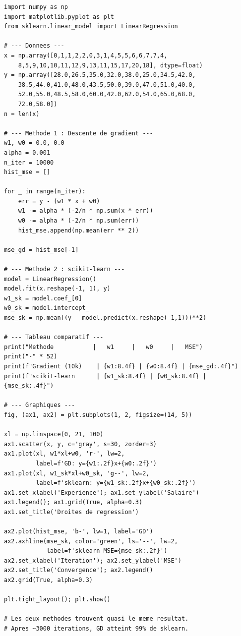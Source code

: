 \begin{pythonbox}
\begin{lstlisting}
import numpy as np
import matplotlib.pyplot as plt
from sklearn.linear_model import LinearRegression

# --- Donnees ---
x = np.array([0,1,1,2,2,0,3,1,4,5,5,6,6,7,7,4,
    8,5,9,10,10,11,12,9,13,11,15,17,20,18], dtype=float)
y = np.array([28.0,26.5,35.0,32.0,38.0,25.0,34.5,42.0,
    38.5,44.0,41.0,48.0,43.5,50.0,39.0,47.0,51.0,40.0,
    52.0,55.0,48.5,58.0,60.0,42.0,62.0,54.0,65.0,68.0,
    72.0,58.0])
n = len(x)

# --- Methode 1 : Descente de gradient ---
w1, w0 = 0.0, 0.0
alpha = 0.001
n_iter = 10000
hist_mse = []

for _ in range(n_iter):
    err = y - (w1 * x + w0)
    w1 -= alpha * (-2/n * np.sum(x * err))
    w0 -= alpha * (-2/n * np.sum(err))
    hist_mse.append(np.mean(err ** 2))

mse_gd = hist_mse[-1]

# --- Methode 2 : scikit-learn ---
model = LinearRegression()
model.fit(x.reshape(-1, 1), y)
w1_sk = model.coef_[0]
w0_sk = model.intercept_
mse_sk = np.mean((y - model.predict(x.reshape(-1,1)))**2)

# --- Tableau comparatif ---
print("Methode           |   w1     |   w0     |   MSE")
print("-" * 52)
print(f"Gradient (10k)    | {w1:8.4f} | {w0:8.4f} | {mse_gd:.4f}")
print(f"scikit-learn      | {w1_sk:8.4f} | {w0_sk:8.4f} | {mse_sk:.4f}")

# --- Graphiques ---
fig, (ax1, ax2) = plt.subplots(1, 2, figsize=(14, 5))

xl = np.linspace(0, 21, 100)
ax1.scatter(x, y, c='gray', s=30, zorder=3)
ax1.plot(xl, w1*xl+w0, 'r-', lw=2,
         label=f'GD: y={w1:.2f}x+{w0:.2f}')
ax1.plot(xl, w1_sk*xl+w0_sk, 'g--', lw=2,
         label=f'sklearn: y={w1_sk:.2f}x+{w0_sk:.2f}')
ax1.set_xlabel('Experience'); ax1.set_ylabel('Salaire')
ax1.legend(); ax1.grid(True, alpha=0.3)
ax1.set_title('Droites de regression')

ax2.plot(hist_mse, 'b-', lw=1, label='GD')
ax2.axhline(mse_sk, color='green', ls='--', lw=2,
            label=f'sklearn MSE={mse_sk:.2f}')
ax2.set_xlabel('Iteration'); ax2.set_ylabel('MSE')
ax2.set_title('Convergence'); ax2.legend()
ax2.grid(True, alpha=0.3)

plt.tight_layout(); plt.show()

# Les deux methodes trouvent quasi le meme resultat.
# Apres ~3000 iterations, GD atteint 99% de sklearn.
\end{lstlisting}
\end{pythonbox}

